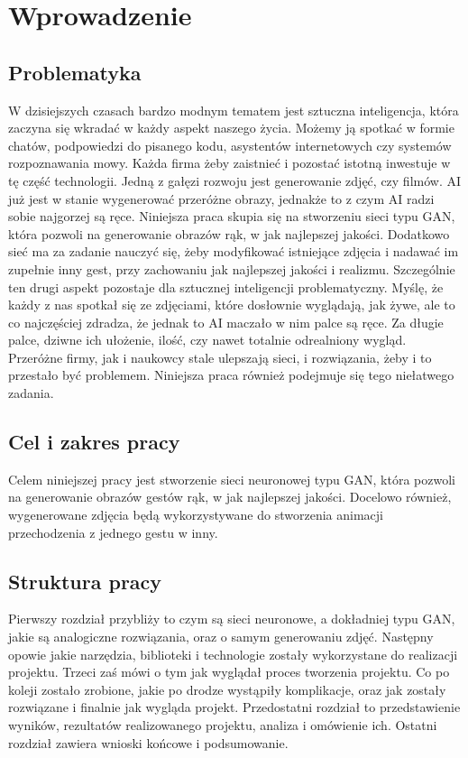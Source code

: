 \documentclass[12pt]{article}
\begin{document}
\begin{sloppypar}


\tableofcontents
\newpage

\section{Wprowadzenie}
{
  \subsection{Problematyka}
  {
    W dzisiejszych czasach bardzo modnym tematem jest sztuczna inteligencja, która zaczyna się wkradać w każdy aspekt naszego życia.
    Możemy ją spotkać w formie chatów, podpowiedzi do pisanego kodu, asystentów internetowych czy systemów rozpoznawania mowy.
    Każda firma żeby zaistnieć i pozostać istotną inwestuje w tę część technologii. Jedną z gałęzi rozwoju jest generowanie zdjęć, czy filmów.
    AI już jest w stanie wygenerować przeróżne obrazy, jednakże to z czym AI radzi sobie najgorzej są ręce.\cite{hand1000}
    \newline
    Niniejsza praca skupia się na stworzeniu sieci typu GAN, która pozwoli na generowanie obrazów rąk, w jak najlepszej jakości.
    Dodatkowo sieć ma za zadanie nauczyć się, żeby modyfikować istniejące zdjęcia i nadawać im zupełnie inny gest, przy zachowaniu jak najlepszej jakości i realizmu.
    Szczególnie ten drugi aspekt pozostaje dla sztucznej inteligencji problematyczny. 
    Myślę, że każdy z nas spotkał się ze zdjęciami, które dosłownie wyglądają, jak żywe, ale to co najczęściej zdradza, że jednak to AI maczało w nim palce są ręce.
    Za długie palce, dziwne ich ułożenie, ilość, czy nawet totalnie odrealniony wygląd. 
    Przeróżne firmy, jak i naukowcy stale ulepszają sieci, i rozwiązania, żeby i to przestało być problemem.
    Niniejsza praca również podejmuje się tego niełatwego zadania.
  }
  \subsection{Cel i zakres pracy}
  {
    Celem niniejszej pracy jest stworzenie sieci neuronowej typu GAN, 
    która pozwoli na generowanie obrazów gestów rąk, w jak najlepszej jakości.
    \newline
    Docelowo również, wygenerowane zdjęcia będą wykorzystywane do stworzenia animacji przechodzenia z jednego gestu w inny.
  }
  \subsection{Struktura pracy}
  {
    Pierwszy rozdział przybliży to czym są sieci neuronowe, a dokładniej typu GAN, jakie są analogiczne rozwiązania, oraz o samym generowaniu zdjęć.
    Następny opowie jakie narzędzia, biblioteki i technologie zostały wykorzystane do realizacji projektu. 
    Trzeci zaś mówi o tym jak wyglądał proces tworzenia projektu. Co po koleji zostało zrobione, jakie po drodze wystąpiły komplikacje, oraz jak zostały rozwiązane i finalnie jak wygląda projekt.
    Przedostatni rozdział to przedstawienie wyników, rezultatów realizowanego projektu, analiza i omówienie ich.
    Ostatni rozdział zawiera wnioski końcowe i podsumowanie.
  }
}


\end{sloppypar}
\end{document}
